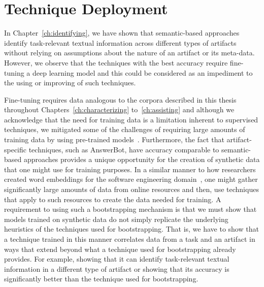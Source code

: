 \section{Technique Deployment}


 

 

In Chapter~\ref{ch:identifying}, we have shown that semantic-based approaches identify task-relevant textual information across
different types of artifacts without relying on
assumptions about the nature of an artifact or its meta-data.
However, we
observe that the techniques with the best accuracy require fine-tuning 
a deep learning model
and this could be considered as an impediment to the using or improving of such  techniques. 


Fine-tuning requires data analogous to the corpora described in this thesis
throughout Chapters~\ref{ch:characterizing} to~\ref{ch:assisting} 
and although we acknowledge that the need for training data is a limitation inherent to supervised techniques,
we mitigated some of the challenges of requiring large amounts of training data by using pre-trained models~\cite{erhan2010pre-train}.
Furthermore, the fact that artifact-specific techniques, such as AnswerBot, have accuracy comparable to semantic-based approaches
 provides
a unique opportunity for the creation of synthetic data that one might use for training purposes.
In a similar manner to how researchers created word embeddings for the software engineering domain~\cite{Efstathiou2018}, one might gather significantly large amounts of data from online resources
and then, use techniques that apply to such resources to create the data needed for training.
A requirement to using such a bootstrapping mechanism is that we must show that models trained on synthetic data do not simply replicate the underlying heuristics of the techniques used for bootstrapping. That is, we have to show that a technique trained
in this manner correlates data from a task and an artifact in ways that
extend beyond what a technique used for bootstrapping already provides. For example, showing that
it can identify task-relevant textual information in a different type of artifact or showing
that its accuracy is significantly better than the technique used for bootstrapping.



